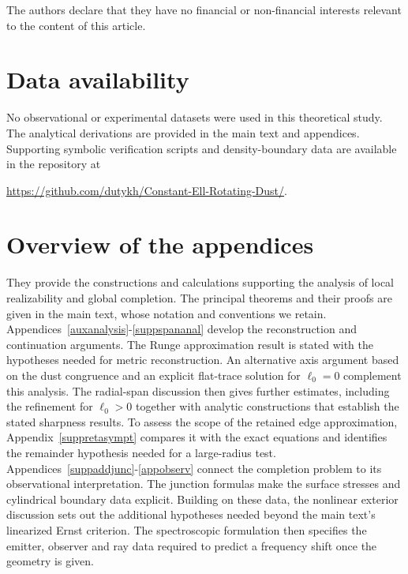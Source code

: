 \documentclass[amsmath,amsfonts,amssymb,aps,pra,superscriptaddress,10pt]{revtex4-2}
\numberwithin{equation}{section}
\theoremstyle{plain}
\theoremstyle{definition}
\theoremstyle{remark}
\theoremstyle{definition}
\newcommand{\ellzero}{\ell_0}
\begin{document}
The authors declare that they have no financial or non-financial
interests relevant to the content of this article.

\section*{Data availability}

No observational or experimental datasets were used in this theoretical study. The analytical derivations are provided in the main text and appendices. Supporting symbolic verification scripts and density-boundary data are available in the repository at 

\url{https://github.com/dutykh/Constant-Ell-Rotating-Dust/}.

\section*{Overview of the appendices}

They provide the constructions and calculations supporting the analysis of local realizability and global completion. The principal theorems and their proofs are given in the main text, whose notation and conventions we retain. Appendices~\ref{auxanalysis}-\ref{suppspananal} develop the reconstruction and continuation arguments. The Runge approximation result is stated with the hypotheses needed for metric reconstruction. An alternative axis argument based on the dust congruence and an explicit flat-trace solution for $\ellzero=0$ complement this analysis. The radial-span discussion then gives further estimates, including the refinement for $\ellzero>0$ together with analytic constructions that establish the stated sharpness results. To assess the scope of the retained edge approximation, Appendix~\ref{suppretasympt} compares it with the exact equations and identifies the remainder hypothesis needed for a large-radius test. Appendices~\ref{suppaddjunc}-\ref{appobserv} connect the completion problem to its observational interpretation. The junction formulas make the surface stresses and cylindrical boundary data explicit. Building on these data, the nonlinear exterior discussion sets out the additional hypotheses needed beyond the main text's linearized Ernst criterion. The spectroscopic formulation then specifies the emitter, observer and ray data required to predict a frequency shift once the geometry is given. 

\appendix
{}
\end{document}
